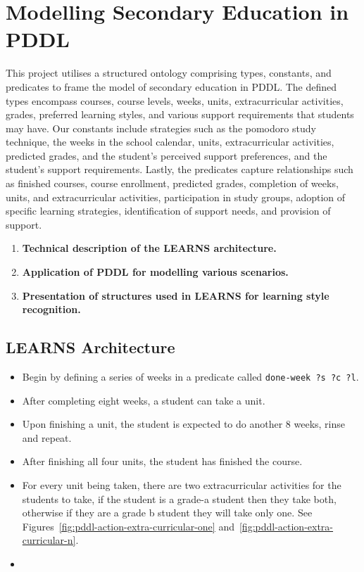 \section{Modelling Secondary Education in PDDL}
This project utilises a structured ontology comprising types, constants, and predicates to frame the model of secondary education in PDDL\@. The defined types encompass courses, course levels, weeks, units, extracurricular activities, grades, preferred learning styles, and various support requirements that students may have. Our constants include strategies such as the pomodoro study technique, the weeks in the school calendar, units, extracurricular activities, predicted grades, and the student's perceived support preferences, and the student's support requirements. Lastly, the predicates capture relationships such as finished courses, course enrollment, predicted grades, completion of weeks, units, and extracurricular activities, participation in study groups, adoption of specific learning strategies, identification of support needs, and provision of support.
\begin{enumerate}
    \item \textbf{Technical description of the LEARNS architecture.}
    \item \textbf{Application of PDDL for modelling various scenarios.}
    \item \textbf{Presentation of structures used in LEARNS for learning style recognition.}
\end{enumerate}

\subsection{LEARNS Architecture}








\begin{itemize}
    \item Begin by defining a series of weeks in a predicate called \texttt{done-week ?s ?c ?l}.
    \item After completing eight weeks, a student can take a unit.
    \item Upon finishing a unit, the student is expected to do another 8 weeks, rinse and repeat.
    \item After finishing all four units, the student has finished the course.
    \item For every unit being taken, there are two extracurricular activities for the students to take, if the student is a grade-a student then they take both, otherwise if they are a grade b student they will take only one. See Figures~\ref{fig:pddl-action-extra-curricular-one} and~\ref{fig:pddl-action-extra-curricular-n}.
    \item 
\end{itemize}

